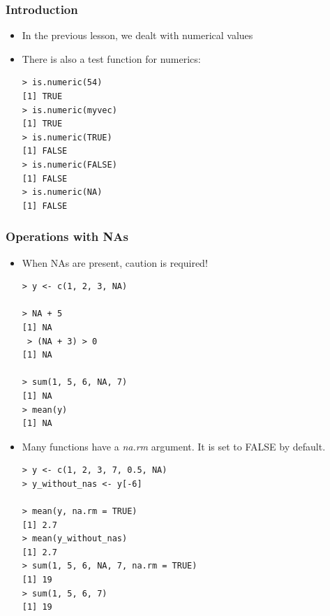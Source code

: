 \documentclass[xcolor=dvipsnames, xcolor=table]{beamer} %
\theoremstyle{mystyle}
\begin{document}
\begin{frame}[fragile] %

\frametitle{Introduction}

\begin{itemize}
\item In the previous lesson, we dealt with numerical values
\item There is also a test function for numerics:

\begin{verbatim}
> is.numeric(54)
[1] TRUE
> is.numeric(myvec)
[1] TRUE
> is.numeric(TRUE)
[1] FALSE
> is.numeric(FALSE)
[1] FALSE
> is.numeric(NA)
[1] FALSE
\end{verbatim}

\end{itemize}

\end{frame}

\begin{frame}[fragile] %

\frametitle{Operations with NAs}

\begin{itemize}
\item When NAs are present, caution is required!

\begin{verbatim}
> y <- c(1, 2, 3, NA)

> NA + 5
[1] NA
 > (NA + 3) > 0
[1] NA

> sum(1, 5, 6, NA, 7)
[1] NA 
> mean(y)
[1] NA
\end{verbatim}

\end{itemize}

\end{frame}

\begin{frame}[fragile]

\begin{itemize}
\frametitle{Dealing with missing values}
\item Many functions have a \textit{na.rm} argument. It is set to FALSE by default. 

\begin{verbatim}
> y <- c(1, 2, 3, 7, 0.5, NA)
> y_without_nas <- y[-6]

> mean(y, na.rm = TRUE)
[1] 2.7
> mean(y_without_nas)
[1] 2.7
> sum(1, 5, 6, NA, 7, na.rm = TRUE)
[1] 19
> sum(1, 5, 6, 7)
[1] 19
\end{verbatim}

\end{itemize}

\end{frame}
\end{document}

